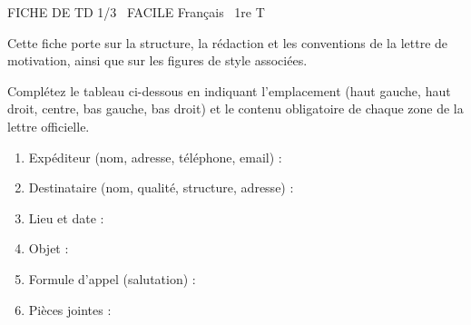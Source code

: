 \documentclass[11pt]{article}
\begin{document}
\begin{tcolorbox}[enhanced,colback=popink,colframe=popink,arc=10pt,boxrule=0pt,left=12pt,right=12pt,top=9pt,bottom=9pt]
{\color{white}\popxbold\small FICHE DE TD 1/3 \textbullet\ FACILE \hfill Français \textbullet\ 1re T\par}
\end{tcolorbox}
\vspace{4pt}
Cette fiche porte sur la structure, la rédaction et les conventions de la lettre de motivation, ainsi que sur les figures de style associées.

\begin{exercice}
Complétez le tableau ci-dessous en indiquant l'emplacement (haut gauche, haut droit, centre, bas gauche, bas droit) et le contenu obligatoire de chaque zone de la lettre officielle.
\begin{enumerate}
    \item Expéditeur (nom, adresse, téléphone, email) : \dotfill
    \item Destinataire (nom, qualité, structure, adresse) : \dotfill
    \item Lieu et date : \dotfill
    \item Objet : \dotfill
    \item Formule d'appel (salutation) : \dotfill
    \item Pièces jointes : \dotfill
\end{enumerate}
\end{exercice}
\end{document}
